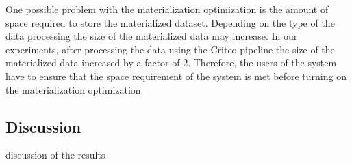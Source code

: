 One possible problem with the materialization optimization is the amount of space required to store the materialized dataset.
Depending on the type of the data processing the size of the materialized data may increase.
In our experiments, after processing the data using the Criteo pipeline the size of the materialized data increased by a factor of 2.
Therefore, the users of the system have to ensure that the space requirement of the system is met before turning on the materialization optimization.

\subsection{Discussion} \label{subsec:discussion}
discussion of the results
